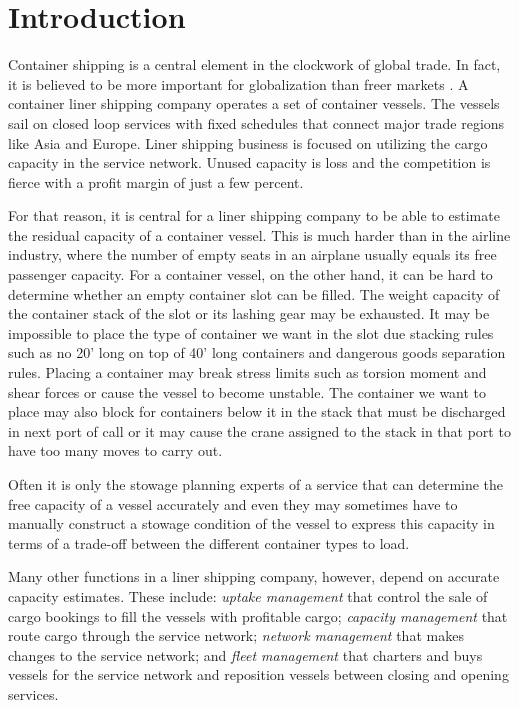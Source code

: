 %

%
\section{Introduction}

Container shipping is a central element in the clockwork of global trade. In fact, it is believed to be more important for globalization than freer markets \cite{EC13}. A container liner shipping company operates a set of container vessels. The vessels sail on closed loop services with fixed  schedules that connect major trade regions like Asia and Europe. Liner shipping business is focused on utilizing the cargo capacity in the service network. Unused capacity is loss and the competition is fierce with a profit margin of just a few percent.  

For that reason, it is central for a liner shipping company to be able to estimate the residual capacity of a container vessel. This is much harder than in the airline industry, where the number of empty seats in an airplane usually equals its free passenger capacity. For a container vessel, on the other hand, it can be hard to determine whether an empty container slot can be filled. The weight capacity of the container stack of the slot or its lashing gear may be exhausted. It may be impossible to place the type of container we want in the slot due stacking rules such as no 20' long on top of 40' long containers and dangerous goods separation rules. Placing a container may break stress limits such as torsion moment and shear forces or cause the vessel to become unstable. The container we want to place may also block for containers below it in the stack that must be discharged in next port of call or it may cause the crane assigned to the stack in that port to have too many moves to carry out. 

Often it is only the stowage planning experts of a service that can determine the free capacity of a vessel accurately and even they may sometimes have to manually construct a stowage condition of the vessel to express this capacity in terms of a trade-off between the different container types to load.

Many other functions in a liner shipping company, however, depend on accurate capacity estimates. These include: {\em uptake management} that control the sale of cargo bookings to fill the vessels with profitable cargo; {\em capacity management} that route cargo through the service network; {\em network management} that makes changes to the service network; and {\em fleet management} that charters and buys vessels for the service network and reposition vessels between closing and opening services.  


